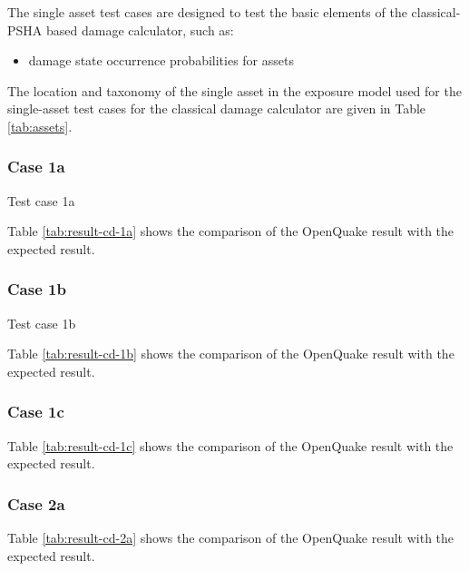 The single asset test cases are designed to test the basic elements of the classical-PSHA based damage calculator, such as:

\begin{itemize}
\item damage state occurrence probabilities for assets
\end{itemize}

The location and taxonomy of the single asset in the exposure model used for the single-asset test cases for the classical damage calculator are given in Table \ref{tab:assets}.


\subsubsection{Case 1a}
Test case 1a 



Table \ref{tab:result-cd-1a} shows the comparison of the OpenQuake result with the expected result.

\subsubsection{Case 1b}
Test case 1b 



Table \ref{tab:result-cd-1b} shows the comparison of the OpenQuake result with the expected result.

\subsubsection{Case 1c}




Table \ref{tab:result-cd-1c} shows the comparison of the OpenQuake result with the expected result.

\subsubsection{Case 2a}




Table \ref{tab:result-cd-2a} shows the comparison of the OpenQuake result with the expected result.

